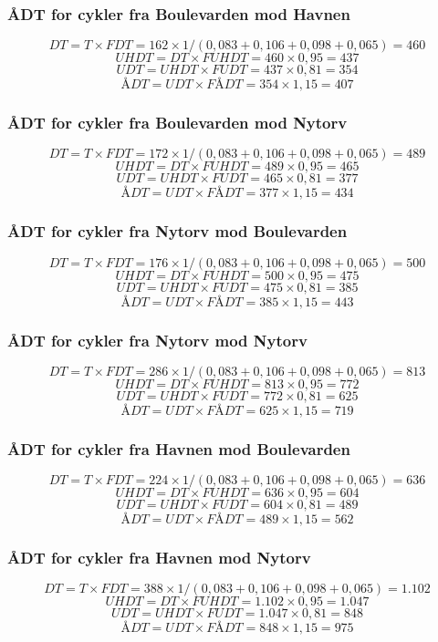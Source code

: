 \subsubsection{ÅDT for cykler fra Boulevarden mod Havnen}
$$DT = T \times FDT = 162 \times 1/(0,083+0,106+0,098+0,065) = 460 $$
$$UHDT = DT \times FUHDT = 460 \times 0,95 = 437$$
$$UDT = UHDT \times FUDT = 437 \times 0,81 = 354$$
$$ÅDT = UDT \times FÅDT = 354 \times 1,15 = 407$$
\subsubsection{ÅDT for cykler fra Boulevarden mod Nytorv}
$$DT = T \times FDT = 172 \times 1/(0,083+0,106+0,098+0,065) = 489$$
$$UHDT = DT \times FUHDT = 489 \times 0,95 = 465$$
$$UDT = UHDT \times FUDT = 465 \times 0,81 = 377$$
$$ÅDT = UDT \times FÅDT = 377 \times 1,15 = 434$$
\subsubsection{ÅDT for cykler fra Nytorv mod Boulevarden}
$$DT = T \times FDT = 176 \times 1/(0,083+0,106+0,098+0,065) = 500$$
$$UHDT = DT \times FUHDT = 500 \times 0,95 = 475$$
$$UDT = UHDT \times FUDT = 475 \times 0,81 = 385$$
$$ÅDT = UDT \times FÅDT = 385 \times 1,15 = 443$$
\subsubsection{ÅDT for cykler fra Nytorv mod Nytorv}
$$DT = T \times FDT = 286 \times 1/(0,083+0,106+0,098+0,065) = 813$$
$$UHDT = DT \times FUHDT = 813 \times 0,95 = 772$$
$$UDT = UHDT \times FUDT = 772 \times 0,81 = 625$$
$$ÅDT = UDT \times FÅDT = 625 \times 1,15 = 719$$
\subsubsection{ÅDT for cykler fra Havnen mod Boulevarden}
$$DT = T \times FDT = 224 \times 1/(0,083+0,106+0,098+0,065) = 636$$
$$UHDT = DT \times FUHDT = 636 \times 0,95 = 604$$
$$UDT = UHDT \times FUDT = 604 \times 0,81 = 489$$
$$ÅDT = UDT \times FÅDT = 489 \times 1,15 = 562$$
\subsubsection{ÅDT for cykler fra Havnen mod Nytorv}
$$DT = T \times FDT = 388 \times 1/(0,083+0,106+0,098+0,065) = 1.102$$
$$UHDT = DT \times FUHDT = 1.102 \times 0,95 = 1.047$$
$$UDT = UHDT \times FUDT = 1.047 \times 0,81 = 848$$
$$ÅDT = UDT \times FÅDT = 848 \times 1,15 = 975$$
